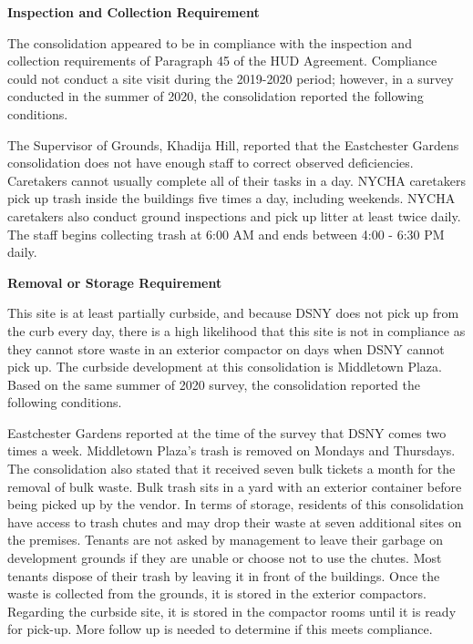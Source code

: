  

\textbf{Inspection and Collection Requirement} 

 

The consolidation appeared to be in compliance with the inspection and collection requirements of Paragraph 45 of the HUD Agreement. Compliance could not conduct a site visit during the 2019-2020 period; however, in a survey conducted in the summer of 2020, the consolidation reported the following conditions.

The Supervisor of Grounds, Khadija Hill, reported that the Eastchester Gardens consolidation does not have enough staff to correct observed deficiencies. Caretakers cannot usually complete all of their tasks in a day. NYCHA caretakers pick up trash inside the buildings five times a day, including weekends. NYCHA caretakers also conduct ground inspections and pick up litter at least twice daily. The staff begins collecting trash at 6:00 AM and ends between 4:00  - 6:30 PM daily.

\textbf{Removal or Storage Requirement} 

  

This site is at least partially curbside, and because DSNY does not pick up from the curb every day, there is a high likelihood that this site is not in compliance as they cannot store waste in an exterior compactor on days when DSNY cannot pick up. The curbside development at this consolidation is Middletown Plaza. Based on the same summer of  2020 survey, the consolidation reported the following conditions.

 

Eastchester Gardens reported at the time of the survey that DSNY comes two times a week. Middletown Plaza's trash is removed on Mondays and Thursdays. The consolidation also stated that it received seven bulk tickets a month for the removal of bulk waste. Bulk trash sits in a yard with an exterior container before being picked up by the vendor. In terms of storage, residents of this consolidation have access to trash chutes and may drop their waste at seven additional sites on the premises. Tenants are not asked by management to leave their garbage on development grounds if they are unable or choose not to use the chutes. Most tenants dispose of their trash by leaving it in front of the buildings. Once the waste is collected from the grounds, it is stored in the exterior compactors. Regarding the curbside site, it is stored in the compactor rooms until it is ready for pick-up. More follow up is needed to determine if this meets compliance.

